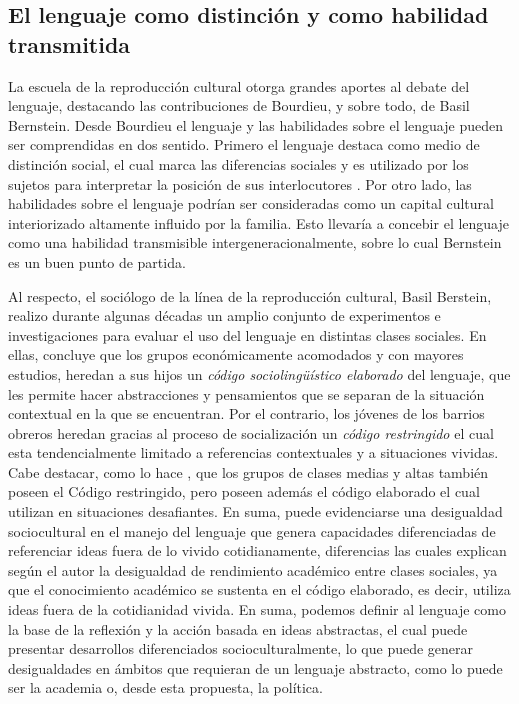 \documentclass[12pt,twoside]{templates/facsothesis}
\begin{document}
\hypertarget{el-lenguaje-como-distinciuxf3n-y-como-habilidad-transmitida}{%
\subsection{El lenguaje como distinción y como habilidad transmitida}\label{el-lenguaje-como-distinciuxf3n-y-como-habilidad-transmitida}}

La escuela de la reproducción cultural otorga grandes aportes al debate del lenguaje, destacando las contribuciones de Bourdieu, y sobre todo, de Basil Bernstein. Desde Bourdieu el lenguaje y las habilidades sobre el lenguaje pueden ser comprendidas en dos sentido. Primero el lenguaje destaca como medio de distinción social, el cual marca las diferencias sociales y es utilizado por los sujetos para interpretar la posición de sus interlocutores \citep{beltran_SOBRE_1990}. Por otro lado, las habilidades sobre el lenguaje podrían ser consideradas como un capital cultural interiorizado altamente influido por la familia. Esto llevaría a concebir el lenguaje como una habilidad transmisible intergeneracionalmente, sobre lo cual Bernstein es un buen punto de partida.

Al respecto, el sociólogo de la línea de la reproducción cultural, Basil Berstein, realizo durante algunas décadas un amplio conjunto de experimentos e investigaciones para evaluar el uso del lenguaje en distintas clases sociales. En ellas, \citet{bernstein_CLASES_1985} concluye que los grupos económicamente acomodados y con mayores estudios, heredan a sus hijos un \emph{código sociolingüístico elaborado} del lenguaje, que les permite hacer abstracciones y pensamientos que se separan de la situación contextual en la que se encuentran. Por el contrario, los jóvenes de los barrios obreros heredan gracias al proceso de socialización un \emph{código restringido} el cual esta tendencialmente limitado a referencias contextuales y a situaciones vividas. Cabe destacar, como lo hace \citet{bernstein_Poder_1988}, que los grupos de clases medias y altas también poseen el Código restringido, pero poseen además el código elaborado el cual utilizan en situaciones desafiantes. En suma, puede evidenciarse una desigualdad sociocultural en el manejo del lenguaje que genera capacidades diferenciadas de referenciar ideas fuera de lo vivido cotidianamente, diferencias las cuales explican según el autor la desigualdad de rendimiento académico entre clases sociales, ya que el conocimiento académico se sustenta en el código elaborado, es decir, utiliza ideas fuera de la cotidianidad vivida. En suma, podemos definir al lenguaje como la base de la reflexión y la acción basada en ideas abstractas, el cual puede presentar desarrollos diferenciados socioculturalmente, lo que puede generar desigualdades en ámbitos que requieran de un lenguaje abstracto, como lo puede ser la academia o, desde esta propuesta, la política.
\end{document}
